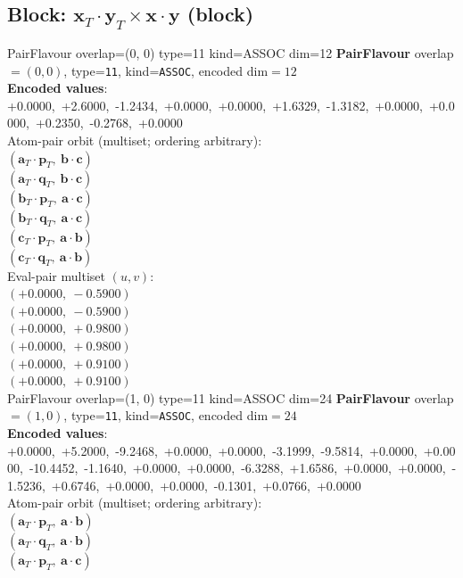 \documentclass[a4paper,11pt]{article}
\newcommand{\pdcegfomjfhook}[2]{\mathbf{#1} \cdot \mathbf{#2}}
\newcommand{\fpbeomcfokjooi}[2]{\mathbf{#1}_T \cdot \mathbf{#2}_T}
\begin{document}
\subsection{Block: $\fpbeomcfokjooi{x}{y} \times \pdcegfomjfhook{x}{y}$  (block)}
    PairFlavour  overlap=(0, 0)  type=11  kind=ASSOC  dim=12
\textbf{PairFlavour} overlap$=(0, 0)$, type=\texttt{11}, kind=\texttt{ASSOC}, encoded dim$=12$\\
\textbf{      Encoded values}: +0.0000,\ +2.6000,\ -1.2434,\ +0.0000,\ +0.0000,\ +1.6329,\ -1.3182,\ +0.0000,\ +0.0000,\ +0.2350,\ -0.2768,\ +0.0000\\
\quad Atom-pair orbit (multiset; ordering arbitrary):\\
$(\fpbeomcfokjooi{a}{p},\ \pdcegfomjfhook{b}{c})$\\
$(\fpbeomcfokjooi{a}{q},\ \pdcegfomjfhook{b}{c})$\\
$(\fpbeomcfokjooi{b}{p},\ \pdcegfomjfhook{a}{c})$\\
$(\fpbeomcfokjooi{b}{q},\ \pdcegfomjfhook{a}{c})$\\
$(\fpbeomcfokjooi{c}{p},\ \pdcegfomjfhook{a}{b})$\\
$(\fpbeomcfokjooi{c}{q},\ \pdcegfomjfhook{a}{b})$\\
\quad Eval-pair multiset $(u, v)$:\\
$(+0.0000,\ -0.5900)$\\
$(+0.0000,\ -0.5900)$\\
$(+0.0000,\ +0.9800)$\\
$(+0.0000,\ +0.9800)$\\
$(+0.0000,\ +0.9100)$\\
$(+0.0000,\ +0.9100)$\\
    PairFlavour  overlap=(1, 0)  type=11  kind=ASSOC  dim=24
\textbf{PairFlavour} overlap$=(1, 0)$, type=\texttt{11}, kind=\texttt{ASSOC}, encoded dim$=24$\\
\textbf{      Encoded values}: +0.0000,\ +5.2000,\ -9.2468,\ +0.0000,\ +0.0000,\ -3.1999,\ -9.5814,\ +0.0000,\ +0.0000,\ -10.4452,\ -1.1640,\ +0.0000,\ +0.0000,\ -6.3288,\ +1.6586,\ +0.0000,\ +0.0000,\ -1.5236,\ +0.6746,\ +0.0000,\ +0.0000,\ -0.1301,\ +0.0766,\ +0.0000\\
\quad Atom-pair orbit (multiset; ordering arbitrary):\\
$(\fpbeomcfokjooi{a}{p},\ \pdcegfomjfhook{a}{b})$\\
$(\fpbeomcfokjooi{a}{q},\ \pdcegfomjfhook{a}{b})$\\
$(\fpbeomcfokjooi{a}{p},\ \pdcegfomjfhook{a}{c})$\\
\end{document}
